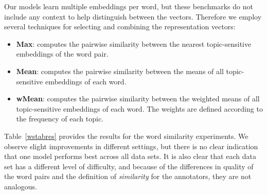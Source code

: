 Our models learn multiple embeddings per word, but these benchmarks do not include any context to help distinguish between the vectors.
Therefore we employ several techniques for selecting and combining the representation vectors:
%
\begin{itemize}
\itemsep0em 
\item \textbf{Max}: computes the pairwise similarity between the nearest topic-sensitive embeddings of the word pair.
\item \textbf{Mean}: computes the pairwise similarity between the means of all topic-sensitive embeddings of each word. 
\item \textbf{wMean}: computes the pairwise similarity between the weighted means of all topic-sensitive embeddings of each word. The weights are defined according to the frequency of each topic.
\end{itemize}


Table~\ref{wstabres} provides the results for the word similarity experiments. 
We observe slight improvements in different settings, but there is no clear indication that one model performs best across all data sets. 
It is also clear that each data set has a different level of difficulty, and because of the differences in quality of the word pairs and the definition of \textit{similarity} for the annotators, they are not analogous. 

